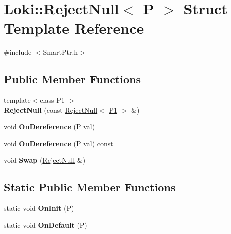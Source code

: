 \hypertarget{structLoki_1_1RejectNull}{}\section{Loki\+:\+:Reject\+Null$<$ P $>$ Struct Template Reference}
\label{structLoki_1_1RejectNull}


{\ttfamily \#include $<$Smart\+Ptr.\+h$>$}

\subsection*{Public Member Functions}
\begin{DoxyCompactItemize}
\item 
\hypertarget{structLoki_1_1RejectNull_a234586f0fdc98184e1cb3f83669d7e63}{}{\footnotesize template$<$class P1 $>$ }\\{\bfseries Reject\+Null} (const \hyperlink{structLoki_1_1RejectNull}{Reject\+Null}$<$ \hyperlink{structP1}{P1} $>$ \&)\label{structLoki_1_1RejectNull_a234586f0fdc98184e1cb3f83669d7e63}

\item 
\hypertarget{structLoki_1_1RejectNull_a02cc3f2e9276e5354e112aae4e5fdd00}{}void {\bfseries On\+Dereference} (P val)\label{structLoki_1_1RejectNull_a02cc3f2e9276e5354e112aae4e5fdd00}

\item 
\hypertarget{structLoki_1_1RejectNull_a962d859f9a4217b62717c38e93465d4e}{}void {\bfseries On\+Dereference} (P val) const \label{structLoki_1_1RejectNull_a962d859f9a4217b62717c38e93465d4e}

\item 
\hypertarget{structLoki_1_1RejectNull_a1e094cca515d25e70e614a80acaf6707}{}void {\bfseries Swap} (\hyperlink{structLoki_1_1RejectNull}{Reject\+Null} \&)\label{structLoki_1_1RejectNull_a1e094cca515d25e70e614a80acaf6707}

\end{DoxyCompactItemize}
\subsection*{Static Public Member Functions}
\begin{DoxyCompactItemize}
\item 
\hypertarget{structLoki_1_1RejectNull_a8c7546770cef0070c12565237609c24f}{}static void {\bfseries On\+Init} (P)\label{structLoki_1_1RejectNull_a8c7546770cef0070c12565237609c24f}

\item 
\hypertarget{structLoki_1_1RejectNull_a4dbbd566ff312fd036190ea028aefc1b}{}static void {\bfseries On\+Default} (P)\label{structLoki_1_1RejectNull_a4dbbd566ff312fd036190ea028aefc1b}

\end{DoxyCompactItemize}


